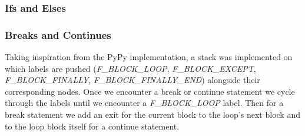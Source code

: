 \documentclass[12pt, titlepage]{article}
\begin{document}
\subsubsection{Ifs and Elses}


\subsubsection{Breaks and Continues} 
Taking inspiration from the PyPy implementation, a stack was implemented on which labels are pushed (\textit{F\_BLOCK\_LOOP}, \textit{F\_BLOCK\_EXCEPT}, \textit{F\_BLOCK\_FINALLY}, \textit{F\_BLOCK\_FINALLY\_END}) alongside their corresponding nodes. Once we encounter a break or continue statement we cycle through the labels until we encounter a \textit{F\_BLOCK\_LOOP} label. Then for a break statement we add an exit for the current block to the loop's next block and to the loop block itself for a continue statement.
\end{document}
